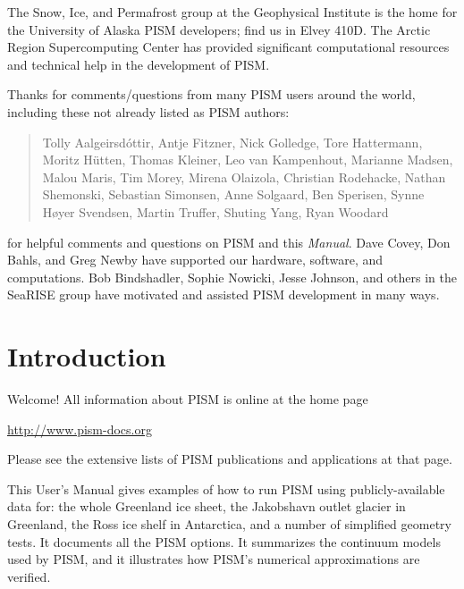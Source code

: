 \documentclass[titlepage,letterpaper,final]{scrartcl}
\begin{document}
The Snow, Ice, and Permafrost group at the Geophysical Institute is the home for the University of Alaska PISM developers; find us in Elvey 410D.  The Arctic Region Supercomputing Center has provided significant computational resources and technical help in the development of PISM.

Thanks for comments/questions from many PISM users around the world, including these not already listed as PISM authors:

\begin{quote}
Tolly A{\dh}algeirsd{\'o}ttir, Antje Fitzner, Nick Golledge, Tore Hattermann, Moritz H\"utten, Thomas Kleiner, Leo van Kampenhout, Marianne Madsen, Malou Maris, Tim Morey, Mirena Olaizola, Christian Rodehacke, Nathan Shemonski, Sebastian Simonsen, Anne Solgaard, Ben Sperisen, Synne H\o{}yer Svendsen, Martin Truffer, Shuting Yang, Ryan Woodard
\end{quote}

\noindent for helpful comments and questions on PISM and this \emph{Manual}.  Dave Covey, Don Bahls, and Greg Newby have supported our hardware, software, and computations.  Bob Bindshadler, Sophie Nowicki, Jesse Johnson, and others in the SeaRISE group have motivated and assisted PISM development in many ways.  

\normalsize



\newpage
\setcounter{tocdepth}{3}
\small
\tableofcontents
\normalsize

\newpage


\section{Introduction}\label{sec:intro}

Welcome!  All information about PISM is online at the home page
\begin{center}
  \url{http://www.pism-docs.org}
\end{center}
Please see the extensive lists of PISM publications and applications at that page.

This User's Manual gives examples of how to run PISM using publicly-available data for: the whole Greenland ice sheet, the Jakobshavn outlet glacier in Greenland, the Ross ice shelf in Antarctica, and a number of simplified geometry tests.  It documents all the PISM options.  It summarizes the continuum models used by PISM, and it illustrates how PISM's numerical approximations are verified.
\end{document}
